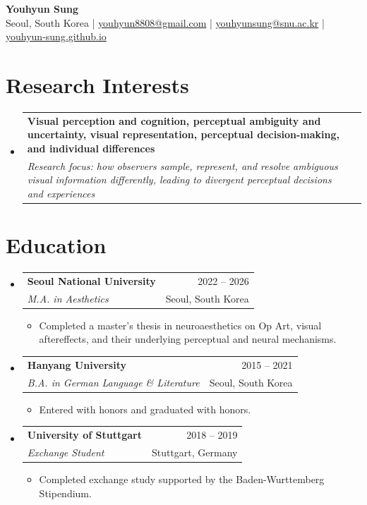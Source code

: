 \documentclass[letterpaper,11pt]{article}
\makeatletter
\newcommand{\resumeItem}[1]{
  \item\small{{#1 \vspace{-1pt}}}
}
\newcommand{\resumeSubheading}[4]{
  \vspace{-1pt}\item
    \begin{tabular*}{\textwidth}[t]{@{}p{0.72\textwidth}@{\extracolsep{\fill}}r@{}}
      \textbf{#1} & {\color{dark-grey}\small #2}\vspace{1pt}\\
      \textit{#3} & {\color{dark-grey}\small #4}\\
    \end{tabular*}\vspace{-4pt}
}
\newcommand{\resumeSubHeadingListStart}{\begin{itemize}[leftmargin=0in, label={}]}
\newcommand{\resumeSubHeadingListEnd}{\end{itemize}}
\newcommand{\resumeItemListStart}{\begin{itemize}}
\newcommand{\resumeItemListEnd}{\end{itemize}\vspace{0pt}}
\makeatother
\begin{document}
\begin{center}
  \textbf{\Huge Youhyun Sung} \\ \vspace{5pt}
  \small
  Seoul, South Korea \hspace{4pt} | \hspace{4pt}
  \href{mailto:youhyun8808@gmail.com}{youhyun8808@gmail.com} \hspace{4pt} | \hspace{4pt}
  \href{mailto:youhyunsung@snu.ac.kr}{youhyunsung@snu.ac.kr} \hspace{4pt} | \hspace{4pt}
  \href{https://youhyun-sung.github.io}{youhyun-sung.github.io} \\
  \vspace{-3pt}
\end{center}

\section{Research Interests}
\resumeSubHeadingListStart
  \resumeSubheading
    {Visual perception and cognition, perceptual ambiguity and uncertainty, visual representation, perceptual decision-making, and individual differences}{}
    {Research focus: how observers sample, represent, and resolve ambiguous visual information differently, leading to divergent perceptual decisions and experiences}{}
\resumeSubHeadingListEnd

\section{Education}
\resumeSubHeadingListStart
  \resumeSubheading
    {Seoul National University}{2022 -- 2026}
    {M.A. in Aesthetics}{Seoul, South Korea}
  \resumeItemListStart
    \resumeItem{Completed a master's thesis in neuroaesthetics on Op Art, visual aftereffects, and their underlying perceptual and neural mechanisms.}
  \resumeItemListEnd

  \resumeSubheading
    {Hanyang University}{2015 -- 2021}
    {B.A. in German Language \& Literature}{Seoul, South Korea}
  \resumeItemListStart
    \resumeItem{Entered with honors and graduated with honors.}
  \resumeItemListEnd

  \resumeSubheading
    {University of Stuttgart}{2018 -- 2019}
    {Exchange Student}{Stuttgart, Germany}
  \resumeItemListStart
    \resumeItem{Completed exchange study supported by the Baden-Wurttemberg Stipendium.}
  \resumeItemListEnd
\resumeSubHeadingListEnd
\end{document}
